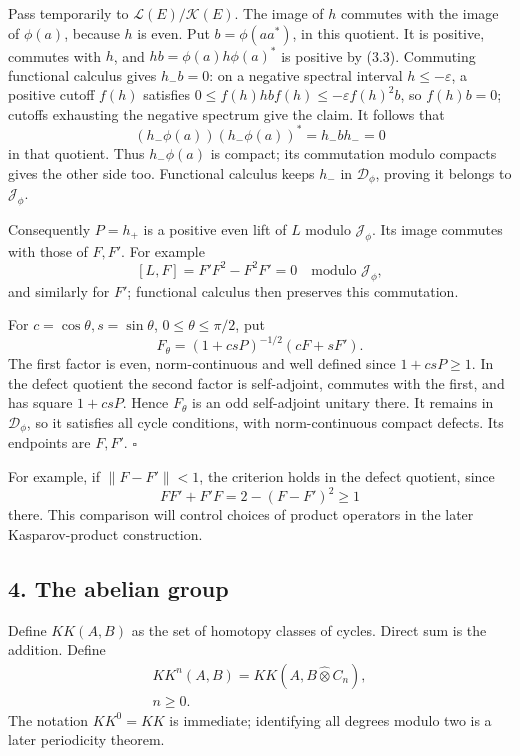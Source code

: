 \documentclass[
  11pt,
]{article}
\begin{document}
Pass temporarily to \(\mathcal L(E)/\mathcal K(E)\). The image of \(h\)
commutes with the image of \(\phi(a)\), because \(h\) is even. Put
\(b=\phi(aa^*)\), in this quotient. It is positive, commutes with \(h\),
and \(hb=\phi(a)h\phi(a)^*\) is positive by (3.3). Commuting functional
calculus gives \(h_-b=0\): on a negative spectral interval
\(h\leq-\varepsilon\), a positive cutoff \(f(h)\) satisfies
\(0\leq f(h)hb f(h)\leq-\varepsilon f(h)^2b\), so \(f(h)b=0\); cutoffs
exhausting the negative spectrum give the claim. It follows that \[
(h_-\phi(a))(h_-\phi(a))^*=h_-bh_-=0
\] in that quotient. Thus \(h_-\phi(a)\) is compact; its commutation
modulo compacts gives the other side too. Functional calculus keeps
\(h_-\) in \(\mathcal D_\phi\), proving it belongs to
\(\mathcal J_\phi\).

Consequently \(P=h_+\) is a positive even lift of \(L\) modulo
\(\mathcal J_\phi\). Its image commutes with those of \(F,F'\). For
example \[
[L,F]=F'F^2-F^2F'=0
\quad\text{modulo }\mathcal J_\phi,
\] and similarly for \(F'\); functional calculus then preserves this
commutation.

For \(c=\cos\theta,s=\sin\theta\), \(0\leq\theta\leq\pi/2\), put \[
F_\theta=(1+csP)^{-1/2}(cF+sF').
\tag{3.4}
\] The first factor is even, norm-continuous and well defined since
\(1+csP\geq1\). In the defect quotient the second factor is
self-adjoint, commutes with the first, and has square \(1+csP\). Hence
\(F_\theta\) is an odd self-adjoint unitary there. It remains in
\(\mathcal D_\phi\), so it satisfies all cycle conditions, with
norm-continuous compact defects. Its endpoints are \(F,F'\). \(\square\)

For example, if \(\|F-F'\|<1\), the criterion holds in the defect
quotient, since \[
FF'+F'F=2-(F-F')^2\geq1
\] there. This comparison will control choices of product operators in
the later Kasparov-product construction.

\subsection{4. The abelian group}\label{the-abelian-group}

Define \(KK(A,B)\) as the set of homotopy classes of cycles. Direct sum
is the addition. Define \[
\begin{gathered}
KK^n(A,B)=KK(A,B\widehat\otimes C_n),\\
 n\geq0.
\end{gathered}
\tag{4.1}
\] The notation \(KK^0=KK\) is immediate; identifying all degrees modulo
two is a later periodicity theorem.
\end{document}
